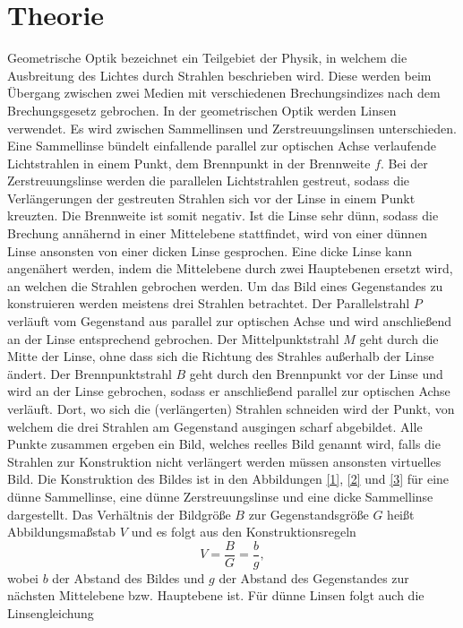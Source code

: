 \section{Theorie}
\label{sec:Theorie}

Geometrische Optik bezeichnet ein Teilgebiet der Physik, in welchem die Ausbreitung des Lichtes durch Strahlen beschrieben wird. Diese werden beim Übergang zwischen zwei Medien mit verschiedenen Brechungsindizes nach dem Brechungsgesetz gebrochen. In der geometrischen Optik werden Linsen verwendet. Es wird zwischen Sammellinsen und Zerstreuungslinsen unterschieden. Eine Sammellinse bündelt einfallende parallel zur optischen Achse verlaufende Lichtstrahlen in einem Punkt, dem Brennpunkt in der Brennweite $f$. Bei der Zerstreuungslinse werden die parallelen Lichtstrahlen gestreut, sodass die Verlängerungen der gestreuten Strahlen sich vor der Linse in einem Punkt kreuzten. Die Brennweite ist somit negativ. Ist die Linse sehr dünn, sodass die Brechung annähernd in einer Mittelebene stattfindet, wird von einer dünnen Linse ansonsten von einer dicken Linse gesprochen. Eine dicke Linse kann angenähert werden, indem die Mittelebene durch zwei Hauptebenen ersetzt wird, an welchen die Strahlen gebrochen werden. Um das Bild eines Gegenstandes zu konstruieren werden meistens drei Strahlen betrachtet. Der Parallelstrahl $P$ verläuft vom Gegenstand aus parallel zur optischen Achse und wird anschließend an der Linse entsprechend gebrochen. Der Mittelpunktstrahl $M$ geht durch die Mitte der Linse, ohne dass sich die Richtung des Strahles außerhalb der Linse ändert. Der Brennpunktstrahl $B$ geht durch den Brennpunkt vor der Linse und wird an der Linse gebrochen, sodass er anschließend parallel zur optischen Achse verläuft. Dort, wo sich die (verlängerten) Strahlen schneiden wird der Punkt, von welchem die drei Strahlen am Gegenstand ausgingen scharf abgebildet. Alle Punkte zusammen ergeben ein Bild, welches reelles Bild genannt wird, falls die Strahlen zur Konstruktion nicht verlängert werden müssen ansonsten virtuelles Bild. Die Konstruktion des Bildes ist in den Abbildungen \ref{1}, \ref{2} und \ref{3} für eine dünne Sammellinse, eine dünne Zerstreuungslinse und eine dicke Sammellinse dargestellt. Das Verhältnis der Bildgröße $B$ zur Gegenstandsgröße $G$ heißt Abbildungsmaßstab $V$ und es folgt aus den Konstruktionsregeln
\begin{equation}
 V = \frac{B}{G}=\frac{b}{g},
\end{equation}
wobei $b$ der Abstand des Bildes und $g$ der Abstand des Gegenstandes zur nächsten Mittelebene bzw. Hauptebene ist. Für dünne Linsen folgt auch die Linsengleichung
